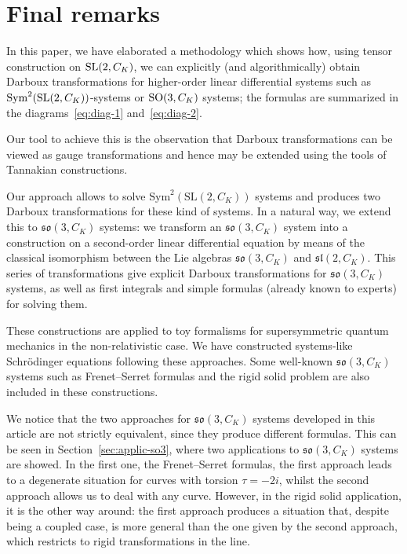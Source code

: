 \documentclass[10pt,a4paper]{amsart}
\numberwithin{equation}{section}
\def\Sym{\mathrm{Sym}}
\begin{document}
\section{Final remarks}

In this paper, we have elaborated a methodology which shows how, using tensor construction on ${\rm SL}(2, C_K)$, we can explicitly (and algorithmically) obtain Darboux transformations for higher-order linear differential systems such as $\Sym^2({\rm SL}(2, C_K))$-systems or ${\rm SO}(3,C_K)$ systems; the formulas are summarized in the diagrams~\eqref{eq:diag-1} and~\eqref{eq:diag-2}.

Our tool to achieve this is the observation that Darboux transformations can be viewed as gauge transformations and hence may be extended using the tools of Tannakian constructions.

Our approach allows to solve $\Sym^2(\mathrm{SL}(2, C_K))$ systems and produces two Darboux transformations for these kind of systems. In a natural way, we extend this to $\mathfrak{so}(3, C_K)$ systems: we transform an $\mathfrak{so}(3, C_K)$ system into a construction on a second-order linear differential equation by means of the classical isomorphism between the Lie algebras $\mathfrak{so}(3, C_K)$ and $\mathfrak{sl} (2, C_K)$.
This series of transformations give explicit Darboux transformations for $\mathfrak{so}(3, C_K)$ systems, as well as first integrals and simple formulas (already known to experts) for solving them.

These constructions are applied to toy formalisms for supersymmetric quantum mechanics in the non-relativistic case. We have constructed systems-like Schr\"odinger equations following these approaches.
Some well-known $\mathfrak{so}(3, C_K)$ systems such as Frenet--Serret formulas and the rigid solid problem are also included in these constructions.


We notice that the two approaches for $\mathfrak{so}(3, C_K)$ systems developed in this article are not strictly equivalent, since they produce different formulas. This can be seen in Section~\ref{sec:applic-so3}, where two applications to $\mathfrak{so}(3, C_K)$ systems are showed. In the first one, the Frenet--Serret formulas, the first approach leads to a degenerate situation for curves with torsion $\tau= -2i$, whilst the second approach allows us to deal with any curve. However, in the rigid solid application, it is the other way around: the first approach produces a situation that, despite being a coupled case, is more general than the one given by the second approach, which restricts to rigid transformations in the line.
\end{document}
